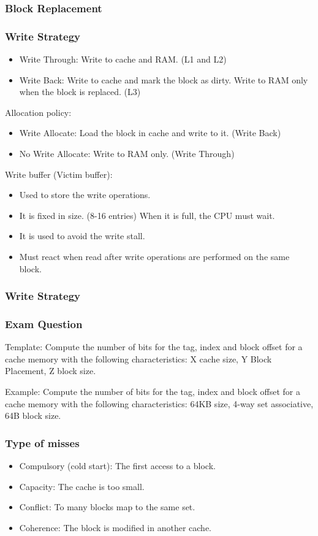 \begin{frame}
    \frametitle{Block Replacement}
\end{frame}

\begin{frame}
    \frametitle{Write Strategy}
    \begin{itemize}
        \item Write Through: Write to cache and RAM. (L1 and L2)
        \item Write Back: Write to cache and mark the block as dirty. Write to RAM only when the block is replaced. (L3)
    \end{itemize}
    Allocation policy:
    \begin{itemize}
        \item Write Allocate: Load the block in cache and write to it. (Write Back)
        \item No Write Allocate: Write to RAM only. (Write Through)
    \end{itemize}
    Write buffer (Victim buffer):
    \begin{itemize}
        \item Used to store the write operations.
        \item It is fixed in size. (8-16 entries) When it is full, the CPU must wait.
        \item It is used to avoid the write stall.
        \item Must react when read after write operations are performed on the same block.
    \end{itemize}
\end{frame}

\begin{frame}
    \frametitle{Write Strategy}
\end{frame}

\begin{frame}
    \frametitle{Exam Question}
    Template: Compute the number of bits for the tag, index and block offset for a cache memory with the following characteristics: X cache size, Y Block Placement, Z block size.

    Example: Compute the number of bits for the tag, index and block offset for a cache memory with the following characteristics: 64KB size, 4-way set associative, 64B block size.
\end{frame}

\begin{frame}
    \frametitle{Type of misses}
    \begin{itemize}
        \item Compulsory (cold start): The first access to a block.
        \item Capacity: The cache is too small.
        \item Conflict: To many blocks map to the same set.
        \item Coherence: The block is modified in another cache.
    \end{itemize}
    \note{
    }
\end{frame}

